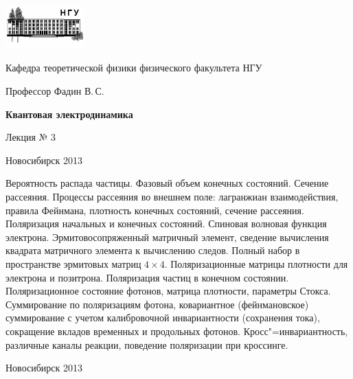 \documentclass[12pt,pagesize,paper=192mm:108mm]{scrbook}
\begin{document}
\begin{titlepage}
  \vspace*{-1em}
  \begin{center}
    \includegraphics[width=0.23\textwidth]{../NSU-logo}

    Кафедра теоретической физики физического факультета НГУ
    \medskip

    \Large
    Профессор Фадин В.\,С.
    \bigskip

    \huge
    \textbf{Квантовая электродинамика}
    \bigskip

    \Large
    Лекция № 3
    \vfill

    \normalsize
    \vfill

    \normalsize \ccbysa\hspace{0.5em}  Новосибирск 2013
  \end{center}
\end{titlepage}
\newpage

\vspace*{-1em}
\begin{center}
\vfill
  \begin{minipage}{0.65\linewidth}
    Вероятность распада частицы. Фазовый объем конечных
    состояний. Сечение рассеяния.  Процессы рассеяния во внешнем поле:
    лагранжиан взаимодействия, правила Фейнмана, плотность конечных
    состояний, сечение рассеяния. Поляризация начальных и конечных
    состояний. Спиновая волновая функция
    электрона. Эрмитовосопряженный матричный элемент, сведение
    вычисления квадрата матричного элемента к вычислению
    следов. Полный набор в пространстве эрмитовых матриц $4 \times
    4$. Поляризационные матрицы плотности для электрона и
    позитрона. Поляризация частиц в конечном
    состоянии. Поляризационное состояние фотонов, матрица плотности,
    параметры Стокса. Суммирование по поляризациям фотона,
    ковариантное (фейнмановское) суммирование с учетом калибровочной
    инвариантности (сохранения тока), сокращение вкладов временных и
    продольных фотонов.  Кросс"=инвариантность, различные каналы
    реакции, поведение поляризации при кроссинге.
  \end{minipage}
  \vfill

  \normalsize \ccbysa\hspace{0.5em} Новосибирск 2013
\end{center}
\end{document}
